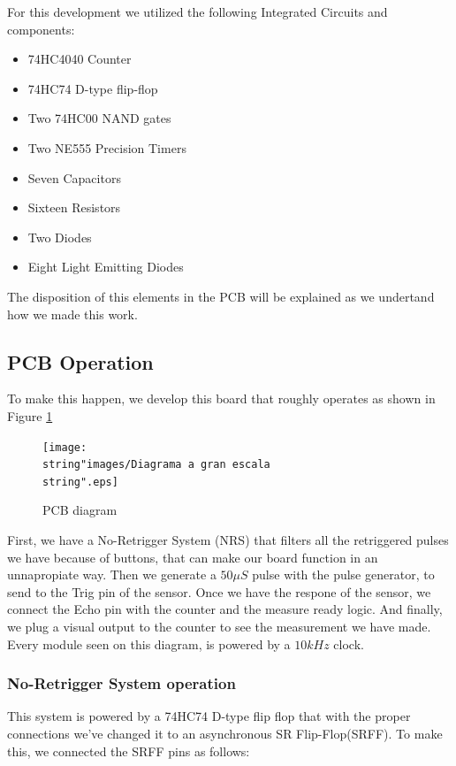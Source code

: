 For this development we utilized the following Integrated Circuits
and components:
\begin{itemize}
\item 74HC4040 Counter 
\item 74HC74 D-type flip-flop
\item Two 74HC00 NAND gates
\item Two NE555 Precision Timers
\item Seven Capacitors
\item Sixteen Resistors
\item Two Diodes
\item Eight Light Emitting Diodes
\end{itemize}
The disposition of this elements in the PCB will be explained as we
undertand how we made this work.

\subsection{PCB Operation}

To make this happen, we develop this board that roughly operates as
shown in Figure \ref{8_3}

\begin{figure}[H]
\begin{centering}
\texttt{[image: \\string"images/Diagrama a gran escala\\string".eps]}
\par\end{centering}
\caption{PCB diagram}

\label{8_3}
\end{figure}

First, we have a No-Retrigger System (NRS) that filters all the retriggered
pulses we have because of buttons, that can make our board function
in an unnapropiate way. Then we generate a $50\mu S$ pulse with the
pulse generator, to send to the Trig pin of the sensor. Once we have
the respone of the sensor, we connect the Echo pin with the counter
and the measure ready logic. And finally, we plug a visual output
to the counter to see the measurement we have made. Every module seen
on this diagram, is powered by a $10kHz$ clock.

\subsubsection{No-Retrigger System operation}

This system is powered by a 74HC74 D-type flip flop that with the
proper connections we've changed it to an asynchronous SR Flip-Flop(SRFF).
To make this, we connected the SRFF pins as follows:

